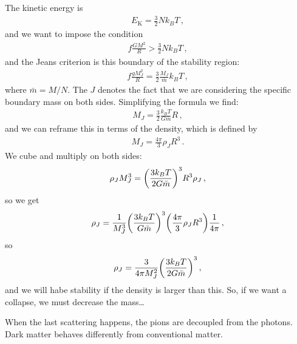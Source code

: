 \documentclass[main.tex]{subfiles}
\begin{document}
The kinetic energy is 
%
\begin{align}
  E _{\text{K}} = \frac{3}{2} N k_B T
\,,
\end{align}
%
and we want to impose the condition 
%
\begin{align}
  f \frac{GM^2}{R} > \frac{3}{2} N k_B T 
\,,
\end{align}
%
and the Jeans criterion is this boundary of the stability region: 
%
\begin{align}
  f \frac{gM_J^2}{R} = \frac{3}{2} \frac{M_J}{\bar{m}} k_B T
\,,
\end{align}
%
where \(\bar{m} = M / N\). 
The \(J\) denotes the fact that we are considering the specific boundary mass on both sides. Simplifying the formula we find: 
%
\begin{align}
  M_J = \frac{3}{2} \frac{k_B T }{G \bar{m}} R
\,,
\end{align}
%
and we can reframe this in terms of the density, which is defined by 
%
\begin{align}
  M_J = \frac{4 \pi }{3} \rho _J R^3
\,.
\end{align}
%
We cube and multiply on both sides: 
%
\begin{align}
  \rho_J M_J^3 = \qty(\frac{3 k_B T}{2 G \bar{m}})^3R^3 \rho_J
\,,
\end{align}
%
so we get 
%
\begin{align}
  \rho_J = \frac{1}{M_J^3} \qty(\frac{3 k_B T}{G \bar{m}})^3 \qty( \frac{4 \pi }{3} \rho_J R^3) \frac{1}{4 \pi }
\,,
\end{align}
%
so 
%
\begin{align}
  \rho _J = \frac{3}{4 \pi M_J^2} \qty(\frac{3 k_B T}{2 G \bar{m}})^3
\,,
\end{align}
%
and we will habe stability if the density is larger than this. So, if we want a collapse, we must decrease the mass\dots

When the last scattering happens, the pions are decoupled from the photons. Dark matter behaves differently from conventional matter. 
\end{document}
